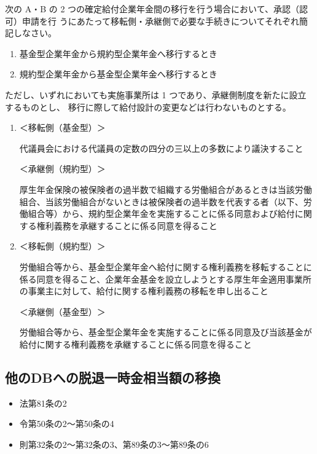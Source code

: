 \begin{shortanswer}[年金1 2019 問題2(3)\textcircled{2}]
  次の A・B の 2 つの確定給付企業年金間の移行を行う場合において、承認（認可）申請を行
うにあたって移転側・承継側で必要な手続きについてそれぞれ簡記しなさい。
\begin{enumerate}[A]
  \item 基金型企業年金から規約型企業年金へ移行するとき
  \item 規約型企業年金から基金型企業年金へ移行するとき
\end{enumerate}
ただし、いずれにおいても実施事業所は 1 つであり、承継側制度を新たに設立するものとし、
移行に際して給付設計の変更などは行わないものとする。
\end{shortanswer}

\begin{answerbox}
  \begin{enumerate}[A]
    \item ＜移転側（基金型）＞
    
代議員会における代議員の定数の四分の三以上の多数により議決すること

＜承継側（規約型）＞

厚生年金保険の被保険者の過半数で組織する労働組合があるときは当該労働組合、当該労働組合がないときは被保険者の過半数を代表する者（以下、労働組合等）から、規約型企業年金を実施することに係る同意および給付に関する権利義務を承継することに係る同意を得ること
\\

    \item ＜移転側（規約型）＞
    
労働組合等から、基金型企業年金へ給付に関する権利義務を移転することに係る同意を得ること、企業年金基金を設立しようとする厚生年金適用事業所の事業主に対して、給付に関する権利義務の移転を申し出ること

＜承継側（基金型）＞

労働組合等から、基金型企業年金を実施することに係る同意及び当該基金が給付に関する権利義務を承継することに係る同意を得ること
  \end{enumerate}
\end{answerbox}

\newpage

\subsection{他のDBへの脱退一時金相当額の移換}


\begin{InyouJobunbox}
  \begin{itemize}
    \item 法第81条の2
    \item 令第50条の2〜第50条の4
    \item 則第32条の2〜第32条の3、第89条の3〜第89条の6
  \end{itemize}
\end{InyouJobunbox}

